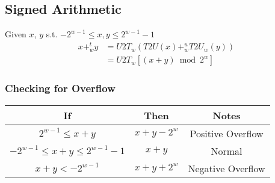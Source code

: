 \documentclass[12pt]{article}
\begin{document}
\subsection{Signed Arithmetic}
Given $x$, $y$ s.t. $-2^{w-1} \leq x,y \leq 2^{w-1}-1$
\begin{align}
x+_w^t y&=U2T_w\left(T2U(x) +_w^u T2U_w(y)\right)\\
&=U2T_w\left[(x+y) \bmod 2^w\right]
\end{align}
\subsubsection{Checking for Overflow}
\begin{tabular}{|c|c|c|}
\hline
If & Then & Notes \\ \hline
$2^{w-1} \leq x+y$ & $x+y-2^w$ & Positive Overflow\\
$-2^{w-1} \leq x+y \leq 2^{w-1}-1$ & $x+y$ & Normal\\
$x+y < -2^{w-1}$ & $x+y+2^w$ & Negative Overflow\\ \hline

\end{tabular}
\end{document}
